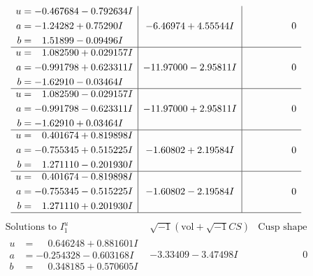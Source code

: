 \documentclass[1p]{elsarticle_modified}
\theoremstyle{definition}
\newcommand{\I}{\sqrt{-1}}
\begin{document}
$$\begin{array}{c|c|c}
\begin{aligned}
u &= -0.467684 - 0.792634 I \\
a &= -1.24282 + 0.75290 I \\
b &= \phantom{-}1.51899 - 0.09496 I\end{aligned}
 & -6.46974 + 4.55544 I & \phantom{-0.000000 } 0 \\ \hline\begin{aligned}
u &= \phantom{-}1.082590 + 0.029157 I \\
a &= -0.991798 + 0.623311 I \\
b &= -1.62910 - 0.03464 I\end{aligned}
 & -11.97000 - 2.95811 I & \phantom{-0.000000 } 0 \\ \hline\begin{aligned}
u &= \phantom{-}1.082590 - 0.029157 I \\
a &= -0.991798 - 0.623311 I \\
b &= -1.62910 + 0.03464 I\end{aligned}
 & -11.97000 + 2.95811 I & \phantom{-0.000000 } 0 \\ \hline\begin{aligned}
u &= \phantom{-}0.401674 + 0.819898 I \\
a &= -0.755345 + 0.515225 I \\
b &= \phantom{-}1.271110 - 0.201930 I\end{aligned}
 & -1.60802 + 2.19584 I & \phantom{-0.000000 } 0 \\ \hline\begin{aligned}
u &= \phantom{-}0.401674 - 0.819898 I \\
a &= -0.755345 - 0.515225 I \\
b &= \phantom{-}1.271110 + 0.201930 I\end{aligned}
 & -1.60802 - 2.19584 I & \phantom{-0.000000 } 0\\
 \hline 
 \end{array}$$\newpage$$\begin{array}{c|c|c}  
\text{Solutions to }I^u_{1}& \I (\text{vol} + \sqrt{-1}CS) & \text{Cusp shape}\\
 \hline 
\begin{aligned}
u &= \phantom{-}0.646248 + 0.881601 I \\
a &= -0.254328 - 0.603168 I \\
b &= \phantom{-}0.348185 + 0.570605 I\end{aligned}
 & -3.33409 - 3.47498 I & \phantom{-0.000000 } 0 \\ \hline\begin{aligned}

\end{aligned}
\end{array}$$
\end{document}
